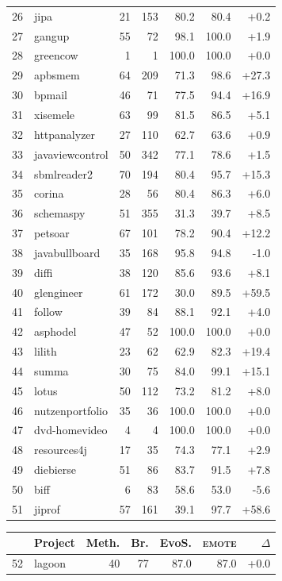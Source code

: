 \begin{table}[p]
\begin{tabular}[t]{rlrrrrr}
26 & jipa & 21 & 153 & 80.2 & 80.4 & +0.2 \\
27 & gangup & 55 & 72 & 98.1 & 100.0 & +1.9 \\
28 & greencow & 1 & 1 & 100.0 & 100.0 & +0.0 \\
29 & apbsmem & 64 & 209 & 71.3 & 98.6 & +27.3 \\
30 & bpmail & 46 & 71 & 77.5 & 94.4 & +16.9 \\
31 & xisemele & 63 & 99 & 81.5 & 86.5 & +5.1 \\
32 & httpanalyzer & 27 & 110 & 62.7 & 63.6 & +0.9 \\
33 & javaviewcontrol & 50 & 342 & 77.1 & 78.6 & +1.5 \\
34 & sbmlreader2 & 70 & 194 & 80.4 & 95.7 & +15.3 \\
35 & corina & 28 & 56 & 80.4 & 86.3 & +6.0 \\
36 & schemaspy & 51 & 355 & 31.3 & 39.7 & +8.5 \\
37 & petsoar & 67 & 101 & 78.2 & 90.4 & +12.2 \\
38 & javabullboard & 35 & 168 & 95.8 & 94.8 & -1.0 \\
39 & diffi & 38 & 120 & 85.6 & 93.6 & +8.1 \\
40 & glengineer & 61 & 172 & 30.0 & 89.5 & +59.5 \\
41 & follow & 39 & 84 & 88.1 & 92.1 & +4.0 \\
42 & asphodel & 47 & 52 & 100.0 & 100.0 & +0.0 \\
43 & lilith & 23 & 62 & 62.9 & 82.3 & +19.4 \\
44 & summa & 30 & 75 & 84.0 & 99.1 & +15.1 \\
45 & lotus & 50 & 112 & 73.2 & 81.2 & +8.0 \\
46 & nutzenportfolio & 35 & 36 & 100.0 & 100.0 & +0.0 \\
47 & dvd-homevideo & 4 & 4 & 100.0 & 100.0 & +0.0 \\
48 & resources4j & 17 & 35 & 74.3 & 77.1 & +2.9 \\
49 & diebierse & 51 & 86 & 83.7 & 91.5 & +7.8 \\
50 & biff & 6 & 83 & 58.6 & 53.0 & -5.6 \\
51 & jiprof & 57 & 161 & 39.1 & 97.7 & +58.6 \\
\bottomrule
\end{tabular}\hfill
\begin{tabular}[t]{rlrrrrr}
\toprule
 & Project & Meth. & Br. & EvoS. & \textsc{emote} & $\Delta$ \\
\midrule
52 & lagoon & 40 & 77 & 87.0 & 87.0 & +0.0 \\

\end{tabular}
\end{table}
